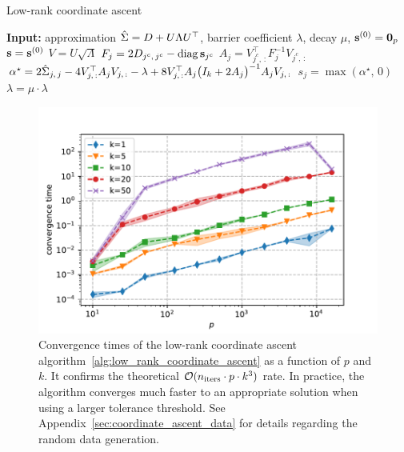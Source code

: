 \begin{algorithm}
    \caption{Low-rank coordinate ascent}\label{alg:low_rank_coordinate_ascent}
    \begin{algorithmic}[1]
        \State \textbf{Input:} approximation $\hat{\Sigma} = D + U \Lambda U^\top$, barrier coefficient $\lambda$,
            decay $\mu$, $\mathbf{s}^{(0)} = \mathbf{0}_p$
        \State $\mathbf{s} = \mathbf{s}^{(0)}$
        \State $V = U \sqrt{\Lambda}$
        \Repeat
        \State $F_j = 2D_{j^c,\, j^c} - \operatorname*{diag}\mathbf{s}_{j^c}$
        \State $A_j = V_{j^c,\, :}^\top F_j^{-1} V_{j^c,\, :}$
        \State $\alpha^\star = 2\hat{\Sigma}_{j,\, j} - 4V_{j,\, :}^\top A_j V_{j,\, :} - \lambda + 8V_{j,\, :}^\top A_j \big( I_k + 2A_j \big)^{-1} A_j V_{j,\, :}$
        \State $s_j = \max\left( \alpha^\star,\, 0 \right)$
        \EndFor
        \State $\lambda = \mu \cdot \lambda$
    \end{algorithmic}
\end{algorithm}
\begin{figure}
    \centering
    \includegraphics[width=0.8\linewidth, height=0.5\linewidth]{figures/low_rank_times.pdf}
    \caption{
        Convergence times of the low-rank coordinate ascent algorithm~\ref{alg:low_rank_coordinate_ascent}
        as a function of $p$ and $k$.
        It confirms the theoretical $\mathcal{O}(n_{\text{iters}} \cdot p \cdot k^3)$ rate.
        In practice,
        the algorithm converges much faster to an appropriate solution when using a larger tolerance threshold.
        See Appendix~\ref{sec:coordinate_ascent_data} for details regarding the random data generation.
    }
    \label{fig:low_rank_times}
\end{figure}


